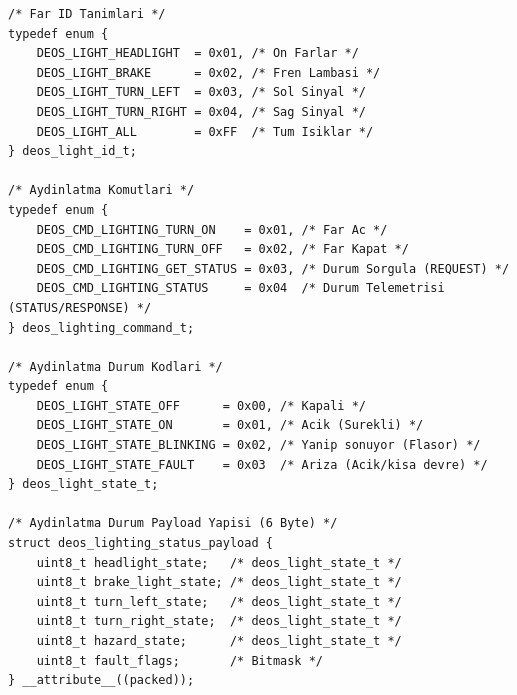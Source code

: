 \documentclass[a4paper,10pt]{article}
\begin{document}
\begin{lstlisting}[style=cstyle]
/* Far ID Tanimlari */
typedef enum {
    DEOS_LIGHT_HEADLIGHT  = 0x01, /* On Farlar */
    DEOS_LIGHT_BRAKE      = 0x02, /* Fren Lambasi */
    DEOS_LIGHT_TURN_LEFT  = 0x03, /* Sol Sinyal */
    DEOS_LIGHT_TURN_RIGHT = 0x04, /* Sag Sinyal */
    DEOS_LIGHT_ALL        = 0xFF  /* Tum Isiklar */
} deos_light_id_t;

/* Aydinlatma Komutlari */
typedef enum {
    DEOS_CMD_LIGHTING_TURN_ON    = 0x01, /* Far Ac */
    DEOS_CMD_LIGHTING_TURN_OFF   = 0x02, /* Far Kapat */
    DEOS_CMD_LIGHTING_GET_STATUS = 0x03, /* Durum Sorgula (REQUEST) */
    DEOS_CMD_LIGHTING_STATUS     = 0x04  /* Durum Telemetrisi (STATUS/RESPONSE) */
} deos_lighting_command_t;

/* Aydinlatma Durum Kodlari */
typedef enum {
    DEOS_LIGHT_STATE_OFF      = 0x00, /* Kapali */
    DEOS_LIGHT_STATE_ON       = 0x01, /* Acik (Surekli) */
    DEOS_LIGHT_STATE_BLINKING = 0x02, /* Yanip sonuyor (Flasor) */
    DEOS_LIGHT_STATE_FAULT    = 0x03  /* Ariza (Acik/kisa devre) */
} deos_light_state_t;

/* Aydinlatma Durum Payload Yapisi (6 Byte) */
struct deos_lighting_status_payload {
    uint8_t headlight_state;   /* deos_light_state_t */
    uint8_t brake_light_state; /* deos_light_state_t */
    uint8_t turn_left_state;   /* deos_light_state_t */
    uint8_t turn_right_state;  /* deos_light_state_t */
    uint8_t hazard_state;      /* deos_light_state_t */
    uint8_t fault_flags;       /* Bitmask */
} __attribute__((packed));
\end{lstlisting}
\end{document}
